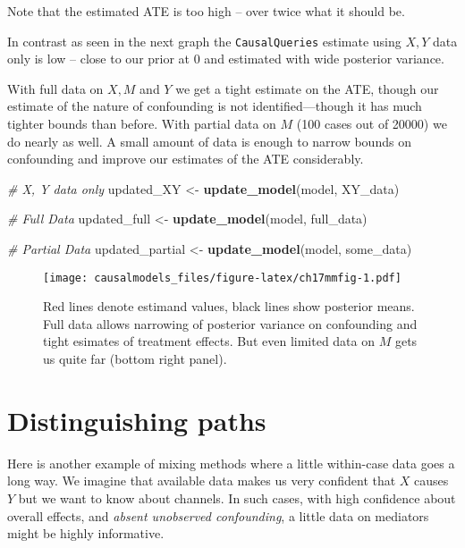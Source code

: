 \documentclass[
  12pt,
]{book}
\newenvironment{Shaded}{\begin{snugshade}}{\end{snugshade}}
\newcommand{\CommentTok}[1]{\textcolor[rgb]{0.56,0.35,0.01}{\textit{#1}}}
\newcommand{\FunctionTok}[1]{\textcolor[rgb]{0.13,0.29,0.53}{\textbf{#1}}}
\newcommand{\NormalTok}[1]{#1}
\newcommand{\OtherTok}[1]{\textcolor[rgb]{0.56,0.35,0.01}{#1}}
\begin{document}
Note that the estimated ATE is too high -- over twice what it should be.

In contrast as seen in the next graph the \texttt{CausalQueries} estimate using \(X,Y\) data only is low -- close to our prior at 0 and estimated with wide posterior variance.

With full data on \(X, M\) and \(Y\) we get a tight estimate on the ATE, though our estimate of the nature of confounding is not identified---though it has much tighter bounds than before. With partial data on \(M\) (100 cases out of 20000) we do nearly as well. A small amount of data is enough to narrow bounds on confounding and improve our estimates of the ATE considerably.

\begin{Shaded}
\begin{Highlighting}[]
\CommentTok{\# X, Y data only}
\NormalTok{updated\_XY      }\OtherTok{\textless{}{-}} \FunctionTok{update\_model}\NormalTok{(model, XY\_data)}

\CommentTok{\# Full Data}
\NormalTok{updated\_full    }\OtherTok{\textless{}{-}} \FunctionTok{update\_model}\NormalTok{(model, full\_data)}

\CommentTok{\# Partial Data}
\NormalTok{updated\_partial }\OtherTok{\textless{}{-}} \FunctionTok{update\_model}\NormalTok{(model, some\_data)}
\end{Highlighting}
\end{Shaded}

\begin{figure}
\centering
\texttt{[image: causalmodels\_files/figure-latex/ch17mmfig-1.pdf]}
\caption{\label{fig:ch17mmfig}Red lines denote estimand values, black lines show posterior means. Full data allows narrowing of posterior variance on confounding and tight esimates of treatment effects. But even limited data on \(M\) gets us quite far (bottom right panel).}
\end{figure}

\hypertarget{distinguishing-paths}{%
\section{Distinguishing paths}\label{distinguishing-paths}}

Here is another example of mixing methods where a little within-case data goes a long way. We imagine that available data makes us very confident that \(X\) causes \(Y\) but we want to know about channels. In such cases, with high confidence about overall effects, and \emph{absent unobserved confounding}, a little data on mediators might be highly informative.
\end{document}
